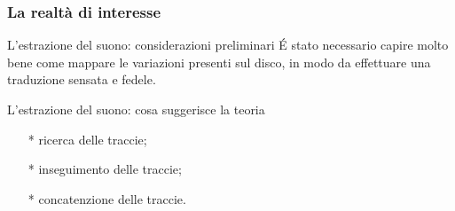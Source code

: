 \begin{frame}
\frametitle{La realtà di interesse}
\begin{block}{L'estrazione del suono: considerazioni preliminari}
\'E stato necessario capire molto bene come mappare le variazioni presenti
sul disco, in modo da effettuare una traduzione sensata e fedele.
\end{block}
\begin{block}{L'estrazione del suono: cosa suggerisce la teoria}
\begin{itemize}
\item[*] ricerca delle traccie;
\item[*] inseguimento delle traccie;
\item[*] concatenzione delle traccie.
\end{itemize}
\end{block}
\end{frame}
